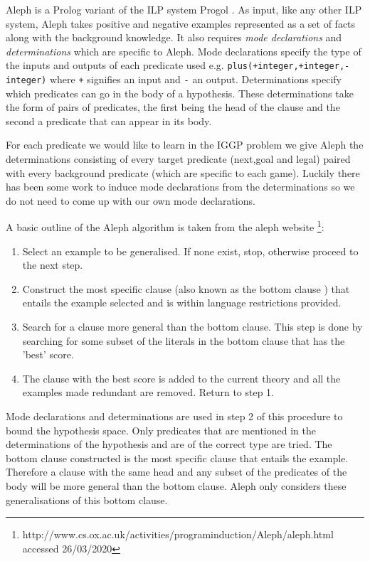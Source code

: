 Aleph is a Prolog variant of the ILP system Progol  \cite{Muggleton/Aleph}. As input, like any other ILP system, Aleph takes positive and negative examples represented as a set of facts along with the background knowledge. It also requires \textit{mode declarations} and \textit{determinations} which are specific to Aleph. Mode declarations specify the type of the inputs and outputs of each predicate used e.g. \texttt{plus(+integer,+integer,-integer)} where \texttt{+} signifies an input and \texttt{-} an output.
Determinations specify which predicates can go in the body of a hypothesis. These determinations take the form of pairs of predicates, the first being the head of the clause and the second a predicate that can appear in its body.

For each predicate we would like to learn in the IGGP problem we give Aleph the determinations consisting of every target predicate (next,goal and legal) paired with every background predicate (which are specific to each game). Luckily there has been some work to induce mode declarations from the determinations  \cite{McCreath/Meta-extraction} so we do not need to come up with our own mode declarations.

A basic outline of the Aleph algorithm is taken from the aleph website \footnote{http://www.cs.ox.ac.uk/activities/programinduction/Aleph/aleph.html accessed 26/03/2020}:
\begin{enumerate}
\item Select an example to be generalised. If none exist, stop, otherwise proceed to the
next step.
\item Construct the most specific clause (also known as the bottom clause  \cite{Muggleton/Aleph}) that entails
the example selected and is within language restrictions provided.
\item Search for a clause more general than the bottom clause. This step is done by searching for some subset of the literals in the bottom clause that has the 'best' score.
\item The clause with the best score is added to the current theory and all the examples
made redundant are removed. Return to step 1.
\end{enumerate}

Mode declarations and determinations are used in step 2 of this procedure to bound the hypothesis space. Only predicates that are mentioned in the determinations of the hypothesis and are of the correct type are tried. The bottom clause constructed is the most specific clause that entails the example. Therefore a clause with the same head and any subset of the predicates of the body will be more general than the bottom clause. Aleph only considers these generalisations of this bottom clause.

